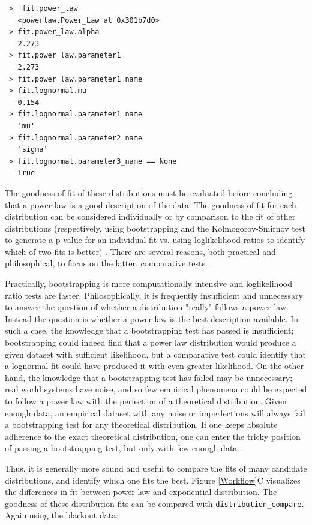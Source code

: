 \documentclass[10pt]{article}
\begin{document}
 \begin{verbatim}
 >  fit.power_law
   <powerlaw.Power_Law at 0x301b7d0>
 > fit.power_law.alpha
   2.273
 > fit.power_law.parameter1
   2.273 
 > fit.power_law.parameter1_name
 > fit.lognormal.mu
   0.154
 > fit.lognormal.parameter1_name
   'mu'
 > fit.lognormal.parameter2_name
   'sigma'
 > fit.lognormal.parameter3_name == None
   True
 \end{verbatim}
 
 The goodness of fit of these distributions must be evaluated before concluding that a power law is a good description of the data. The goodness of fit for each distribution can be considered individually or by comparison to the fit of other distributions (respectively, using bootstrapping and the Kolmogorov-Smirnov test to generate a p-value for an individual fit vs. using loglikelihood ratios to identify which of two fits is better) \cite{Clauset2009}. There are several reasons, both practical and philosophical, to focus on the latter, comparative tests. 
 
 Practically, bootstrapping is more computationally intensive and loglikelihood ratio tests are faster. Philosophically, it is frequently insufficient and unnecessary to answer the question of whether a distribution "really" follows a power law. Instead the question is whether a power law is the best description available. In such a case, the knowledge that a bootstrapping test has passed is insufficient; bootstrapping could indeed find that a power law distribution would produce a given dataset with sufficient likelihood, but a comparative test could identify that a lognormal fit could have produced it with even greater likelihood. On the other hand, the knowledge that a bootstrapping test has failed may be unnecessary; real world systems have noise, and so few empirical phenomena could be expected to follow a power law with the perfection of a theoretical distribution. Given enough data, an empirical dataset with any noise or imperfections will always fail a bootstrapping test for any theoretical distribution. If one keeps absolute adherence to the exact theoretical distribution, one can enter the tricky position of passing a bootstrapping test, but only with few enough data \cite{Klaus2011}. 
 
 Thus, it is generally more sound and useful to compare the fits of many candidate distributions, and identify which one fits the best. Figure \ref{Workflow}C visualizes the differences in fit between power law and exponential distribution. The goodness of these distribution fits can be compared with  \verb$distribution_compare$. Again using the blackout data:
 
\end{document}
